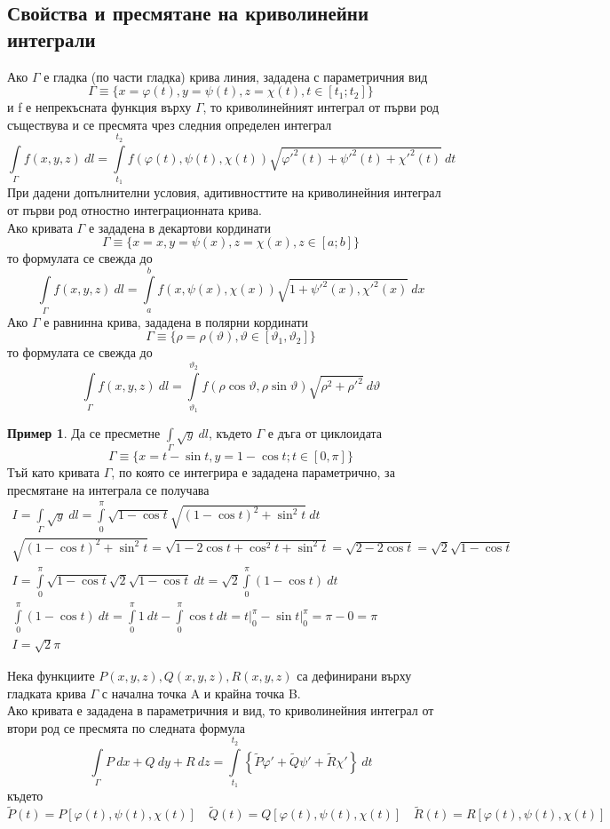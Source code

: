\documentclass[a4paper,fleqn,12pt]{article}
\theoremstyle{definition}
\newtheorem{example}{Пример}[subsection]
\begin{document}
\subsection{Свойства и пресмятане на криволинейни интеграли}
Ако $\Gamma$ е гладка (по части гладка) крива линия, зададена с параметричния вид
$$\Gamma \equiv \{ x= \varphi (t), y = \psi (t) , z = \chi (t), t \in [t_1;t_2] \}$$
и f е непрекъсната функция върху $\Gamma$, то криволинейният интеграл от първи род съществува и се пресмята чрез следния определен интеграл 
$$\int\limits_{\Gamma} f(x,y,z) \ dl =
\int\limits_{t_1} ^{t_2} f(\varphi (t), \psi (t), \chi (t)) \sqrt{\varphi'^2 (t)+ \psi'^2 (t)+ \chi'^2 (t)} \ dt$$
При дадени допълнителни условия, адитивносттите на криволинейния интеграл от първи род отностно интеграционната крива. \\
Ако кривата $\Gamma$  е зададена в декартови кординати 
$$\Gamma \equiv \{ x = x , y = \psi(x), z = \chi (x), z \in [a;b] \}$$
то формулата се свежда до 
$$\int\limits_{\Gamma} f(x,y,z) \ dl = 
\int\limits_a ^b f(x,\psi(x),\chi (x)) \sqrt{1 + \psi'^2 (x),\chi'^2 (x)} \ dx $$
Ако $\Gamma$ е равнинна крива, зададена в полярни кординати 
$$\Gamma \equiv \{ \rho = \rho (\vartheta), \vartheta \in [\vartheta_1, \vartheta_2]\}$$
то формулата се свежда до 
$$\int\limits_{\Gamma} f(x,y,z) \ dl = 
\int\limits_{\vartheta_1} ^{\vartheta_2} f(\rho \cos \vartheta, \rho \sin \vartheta) \sqrt{\rho^2 + \rho'^2 } \ d\vartheta$$

\begin{example}
Да се пресметне $\int\limits_{\Gamma} \sqrt{y} \ dl$, където $\Gamma$ е дъга от циклоидата 
$$\Gamma \equiv \{x = t-\sin t, y = 1 - \cos t ; t \in [0,\pi] \}$$
Тъй като кривата $\Gamma$, по която се интегрира е зададена параметрично, за пресмятане на интеграла се получава 
\begin{gather*}
I = \int\limits_{\Gamma} \sqrt{y} \ dl = \int\limits_0 ^\pi \sqrt{1 - \cos t } \sqrt{(1 - \cos t )^2 + \sin^2 t} \ dt \\
\sqrt{(1 - \cos t )^2 + \sin^2 t} = \sqrt{1 - 2\cos t + \cos^2 t + \sin^2 t} = \sqrt{2 - 2\cos t} = \sqrt{2}\sqrt{1 - \cos t} \\
I =  \int\limits_0 ^\pi \sqrt{1 - \cos t } \sqrt{2}\sqrt{1 - \cos t} \ dt = \sqrt{2} \int\limits_0 ^\pi (1 - \cos t) \ dt \\ 
\int\limits_0 ^\pi (1 - \cos t) \ dt  = \int\limits_0 ^\pi 1 \ dt - \int\limits_0 ^\pi \cos t \ dt  = t \Big|_0 ^\pi - \sin t \Big|_0 ^\pi = \pi - 0 = \pi \\
I = \sqrt{2} \pi
\end{gather*}
\end{example}
Нека функциите $P(x,y,z), Q(x,y,z), R(x,y,z)$ са дефинирани върху гладката крива $\Gamma$ с начална точка A и крайна точка B. \\
Ако кривата е зададена в параметричния и вид, то криволинейния интеграл от втори род се пресмята по следната формула
$$\int\limits_{\Gamma} P \ dx + Q \ dy + R \ dz = 
\int\limits_{t_1} ^{t_2} \left\{ \widetilde{P}\varphi' + \widetilde{Q}\psi' + \widetilde{R}\chi' \right\} \ dt$$
където 
$$\widetilde{P}(t) = P[\varphi(t), \psi (t), \chi (t)] \quad \widetilde{Q}(t) = Q[\varphi(t), \psi (t), \chi (t)] \quad  \widetilde{R}(t) = R[\varphi(t), \psi (t), \chi (t)] $$
\end{document}
